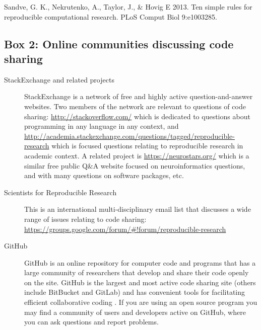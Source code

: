 \documentclass[11pt]{article}
\begin{document}
Sandve, G. K., Nekrutenko,  A., Taylor,  J., \& Hovig E 2013. Ten simple rules for reproducible computational research. PLoS Comput Biol 9:e1003285.

\clearpage

\subsection*{Box 2: Online communities discussing code sharing}

\begin{description}

\item [StackExchange and related projects] StackExchange is a network of free and highly active question-and-answer websites.  Two members of the network are relevant to questions of code sharing: \url{http://stackoverflow.com/} which is dedicated to questions about programming in any language in any context, and \url{http://academia.stackexchange.com/questions/tagged/reproducible-research} which is focused questions relating to reproducible research in academic context. A related project is \url{https://neurostars.org/} which is a similar free public Q\&A website focused on neuroinformatics questions, and with many questions on software packages, etc. 

\item [Scientists for Reproducible Research] This is an international multi-disciplinary email list that discusses a wide range of issues relating to code sharing: \url{https://groups.google.com/forum/\#!forum/reproducible-research}

\item [GitHub] GitHub is an online repository for computer code and programs that has a large community of researchers that develop and share their code openly on the site. GitHub is the largest and most active code sharing site (others include BitBucket and GitLab) and has convenient tools for facilitating efficient collaborative coding \cite{tippmann2014my,Perez-Riverol2016}. If you are using an open source program you may find a community of users and developers active on GitHub, where you can ask questions and report problems.

\end{description}
\end{document}
